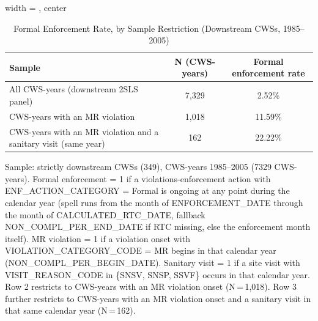 \begin{table}[htbp]
\caption{\label{tab:sanitary_visit_formal_enforcement_rate} Formal Enforcement Rate, by Sample Restriction (Downstream CWSs, 1985--2005)}
\bigskip
\centering
\begin{adjustbox}{width = \textwidth, center}
\begin{tabular}{lcc}
\toprule
Sample & N (CWS-years) & Formal enforcement rate \\
\midrule
All CWS-years (downstream 2SLS panel) & 7{,}329 & 2.52\% \\
CWS-years with an MR violation & 1{,}018 & 11.59\% \\
CWS-years with an MR violation and a sanitary visit (same year) & 162 & 22.22\% \\
\bottomrule
\end{tabular}
\end{adjustbox}
{\tiny\linespread{1}\selectfont \par \raggedright 
Sample: strictly downstream CWSs (349), CWS-years 1985--2005 (7329 CWS-years). Formal enforcement = 1 if a violations-enforcement action with ENF\_ACTION\_CATEGORY = Formal is ongoing at any point during the calendar year (spell runs from the month of ENFORCEMENT\_DATE through the month of CALCULATED\_RTC\_DATE, fallback NON\_COMPL\_PER\_END\_DATE if RTC missing, else the enforcement month itself). MR violation = 1 if a violation onset with VIOLATION\_CATEGORY\_CODE = MR begins in that calendar year (NON\_COMPL\_PER\_BEGIN\_DATE). Sanitary visit = 1 if a site visit with VISIT\_REASON\_CODE in \{SNSV, SNSP, SSVF\} occurs in that calendar year. Row 2 restricts to CWS-years with an MR violation onset (N\,=\,1{,}018). Row 3 further restricts to CWS-years with an MR violation onset and a sanitary visit in that same calendar year (N\,=\,162).
}
\end{table}
